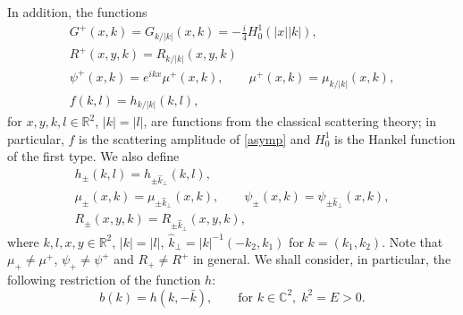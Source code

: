 \documentclass[11pt,a4paper,english,subeqn]{amsart}
\theoremstyle{plain}
\theoremstyle{definition}
\numberwithin{equation}{section}
\begin{document}
In addition, the functions
\begin{gather} \label{defGp}
G^+ (x,k) = G_{k / |k|}(x,k) = - \frac i 4 H^1_0 (|x||k|),\\ \label{defRp}
R^+(x,y,k) = R_{k / |k|}(x,y,k) \\ \label{defpsip}
\psi^+(x,k) = e^{ikx} \mu^+(x,k), \qquad \mu^+(x,k)= \mu_{k / |k|} (x,k), \\  \label{feq}
f(k,l)= h_{k / |k|}(k,l),
\end{gather}
for $x,y,k,l \in {\mathbb{R}}^2$, $|k| = |l|$, are functions from the classical scattering theory; in particular, $f$ is the scattering amplitude of \eqref{asymp} and $H^1_0$ is the Hankel function of the first type.
We also define
\begin{gather}\label{defhpm}
h_{\pm}(k,l) = h_{\pm \hat k_{\bot}}(k,l), \\ \label{defpsipm}
\mu_{\pm}(x,k)= \mu_{\pm \hat k_{\bot}}(x,k), \qquad \psi_{\pm}(x,k)=\psi_{\pm \hat k_{\bot}}(x,k), \\ \label{defRpm}
R_{\pm} (x,y,k) = R_{\pm \hat k_{\bot}}(x,y,k),
\end{gather}
where $k,l,x,y \in {\mathbb{R}}^2$, $|k| =|l|$, $\hat k_{\bot}= |k|^{-1}(-k_2,k_1)$ for $k= (k_1,k_2)$. Note that $\mu_+ \neq \mu^+$, $\psi_+ \neq \psi^+$ and $R_+ \neq R^+$ in general. We shall consider, in particular, the following restriction of the function $h$:
\begin{equation} \label{defb}
b(k)= h(k,-\bar k), \qquad \text{for } k \in {\mathbb{C}}^2, \; k^2= E > 0.
\end{equation}
\end{document}

